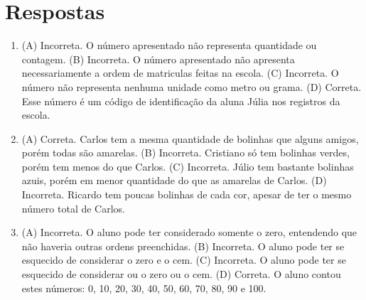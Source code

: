 \chapter{Respostas}
\pagestyle{plain}
\footnotesize

\pagecolor{gray!40}


\begin{enumerate}
\item
(A) Incorreta. O número apresentado não representa quantidade ou contagem.
(B) Incorreta. O número apresentado não apresenta necessariamente a ordem de matriculas feitas na escola.
(C) Incorreta. O número não representa nenhuma unidade como metro ou grama.
(D) Correta. Esse número é um código de identificação da aluna Júlia nos registros da escola.

\item
(A) Correta. Carlos tem a mesma quantidade de bolinhas que alguns amigos, porém todas são amarelas.
(B) Incorreta. Cristiano só tem bolinhas verdes, porém tem menos do que Carlos.
(C) Incorreta. Júlio tem bastante bolinhas azuis, porém em menor quantidade do que as amarelas de Carlos.
(D) Incorreta. Ricardo tem poucas bolinhas de cada cor, apesar de ter o mesmo número total de Carlos.

\item
(A)  Incorreta. O aluno pode ter considerado somente o zero, entendendo que não haveria outras ordens preenchidas.
(B)  Incorreta. O aluno pode ter se esquecido de considerar o zero e o cem.
(C)  Incorreta. O aluno pode ter se esquecido de considerar ou o zero ou o cem.
(D)  Correta. O aluno contou estes números: 0, 10, 20, 30, 40, 50, 60, 70, 80, 90 e 100.
\end{enumerate}


